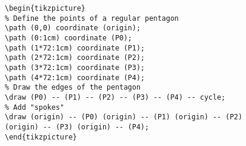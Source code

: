 %
%
%
%

\bgroup
\egroup
%

%

\begin{verbatim}
\begin{tikzpicture}
% Define the points of a regular pentagon
\path (0,0) coordinate (origin);
\path (0:1cm) coordinate (P0);
\path (1*72:1cm) coordinate (P1);
\path (2*72:1cm) coordinate (P2);
\path (3*72:1cm) coordinate (P3);
\path (4*72:1cm) coordinate (P4);
% Draw the edges of the pentagon
\draw (P0) -- (P1) -- (P2) -- (P3) -- (P4) -- cycle;
% Add "spokes"
\draw (origin) -- (P0) (origin) -- (P1) (origin) -- (P2)
(origin) -- (P3) (origin) -- (P4);
\end{tikzpicture}
\end{verbatim}





